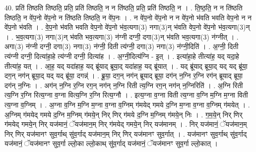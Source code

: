 \documentclass[17pt]{extarticle}
\begin{document}
40. प्रति॑ तिष्ठति तिष्ठति॒ प्रति॒ प्रति॑ तिष्ठति॒ न न ति॑ष्ठति॒ प्रति॒ प्रति॑ तिष्ठति॒ न । . ति॒ष्ठ॒ति॒ न न ति॑ष्ठति तिष्ठति॒ न वे॑प॒नो वे॑प॒नो न ति॑ष्ठति तिष्ठति॒ न वे॑प॒नः । . न वे॑प॒नो वे॑प॒नो न न वे॑प॒नो भ॑वति भवति वेप॒नो न न वे॑प॒नो भ॑वति । . वे॒प॒नो भ॑वति भवति वेप॒नो वे॑प॒नो भ॑व॒त्यगा(3) नगा(3)न् भ॑वति वेप॒नो वे॑प॒नो भ॑व॒त्यगा(3)न् । . भ॒व॒त्यगा(3) नगा(3)न् भ॑वति भव॒त्यगा(3) न॑ग्नी दग्नी॒ दगा(3)न् भ॑वति भव॒त्यगा(3) न॑ग्नीत् । . अगा(3) न॑ग्नी दग्नी॒ दगा(3) नगा(3) न॑ग्नी॒ दिती त्य॑ग्नी॒ दगा(3) नगा(3) न॑ग्नी॒दिति॑ । . अ॒ग्नी॒ दिती त्य॑ग्नी दग्नी॒ दित्या॑हा॒हे त्य॑ग्नी दग्नी॒ दित्या॑ह । . अ॒ग्नी॒दित्य॑ग्नि - इ॒त् । . इत्या॑हा॒हे तीत्या॑ह॒ यद् यदा॒हे तीत्या॑ह॒ यत् । . आ॒ह॒ यद् यदा॑हाह॒ यद् ब्रू॑याद् ब्रूया॒द् यदा॑हाह॒ यद् ब्रू॑यात् । . यद् ब्रू॑याद् ब्रूया॒द् यद् यद् ब्रू॑या॒ दग॒न् नग॑न् ब्रूया॒द् यद् यद् ब्रू॑या॒ दगन्न्॑ । . ब्रू॒या॒ दग॒न् नग॑न् ब्रूयाद् ब्रूया॒ दग॑न् न॒ग्नि र॒ग्नि रग॑न् ब्रूयाद् ब्रूया॒ दग॑न् न॒ग्निः । . अग॑न् न॒ग्नि र॒ग्नि रग॒न् नग॑न् न॒ग्नि रिती त्य॒ग्नि रग॒न् नग॑न् न॒ग्निरिति॑ । . अ॒ग्नि रिती त्य॒ग्नि र॒ग्नि रित्य॒ग्ना व॒ग्ना वित्य॒ग्नि र॒ग्नि रित्य॒ग्नौ । . इत्य॒ग्ना व॒ग्ना विती त्य॒ग्ना व॒ग्नि म॒ग्नि म॒ग्ना विती त्य॒ग्ना व॒ग्निम् । . अ॒ग्ना व॒ग्नि म॒ग्नि म॒ग्ना व॒ग्ना व॒ग्निम् ग॑मयेद् गमये द॒ग्नि म॒ग्ना व॒ग्ना व॒ग्निम् ग॑मयेत् । . अ॒ग्निम् ग॑मयेद् गमये द॒ग्नि म॒ग्निम् ग॑मये॒न् निर् णिर् ग॑मये द॒ग्नि म॒ग्निम् ग॑मये॒न् निः । . ग॒म॒ये॒न् निर् णिर् ग॑मयेद् गमये॒न् निर् यज॑मानं॒ ॅयज॑मान॒म् निर् ग॑मयेद् गमये॒न् निर् यज॑मानम् । . निर् यज॑मानं॒ ॅयज॑मान॒म् निर् णिर् यज॑मानꣳ सुव॒र्गाथ् सु॑व॒र्गाद् यज॑मान॒म् निर् णिर् यज॑मानꣳ सुव॒र्गात् । . यज॑मानꣳ सुव॒र्गाथ् सु॑व॒र्गाद् यज॑मानं॒ ॅयज॑मानꣳ सुव॒र्गा ल्लो॒का ल्लो॒काथ् सु॑व॒र्गाद् यज॑मानं॒ ॅयज॑मानꣳ सुव॒र्गा ल्लो॒कात् । \newline
\end{document}
